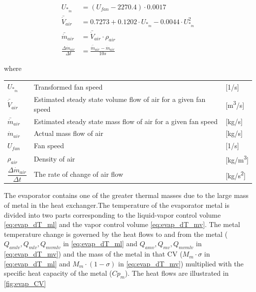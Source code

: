 \begin{align}
	U_{*_{\dot{m}}} & = (U_{fan} - 2270.4)\cdot 0.0017 \label{eq:evap_U_star_mdot}\\
	\bar{\dot{V}}_{air} & = 0.7273 + 0.1202 \cdot 	U_{*_{\dot{m}}}  -0.0044 \cdot 	U_{*_{\dot{m}}}^2	\label{eq:evap_Vbardot_air} \\
	\bar{\dot{m}}_{air} & = \bar{\dot{V}}_{air} \cdot \rho_{air}	\label{eq:Evaporator_FanAirInstantMassFlow} \\
	\frac{\Delta \dot{m}_{air}}{\Delta t} & = \frac{\bar{\dot{m}}_{air}  - \dot{m}_{air}} {10s}	\label{eq:Evaporator_FanAirRateOfChange}
\end{align}

where

\begin{center}
	\begin{tabular}{l p{8cm} l}
		$ 	U_{*_{\dot{m}}} $ 						& Transformed fan speed												& [1/\si{s}]\\
		$\bar{\dot{V}}_{air}$						& Estimated steady state volume flow of air for a given fan speed 	& [\si{m^3}/\si{s}] \\
		$\bar{\dot{m}}_{air}$						& Estimated steady state mass flow of air for a given fan speed 	& [\si{kg}/\si{s}] \\
		$\dot{m}_{air}$								& Actual mass flow of air					  						& [\si{kg}/\si{s}] \\
		$U_{fan}$									& Fan speed 														& [1/\si{s}] \\
		$\rho_{air}$								& Density of air													& [\si{kg}/\si{m^3}] \\[0.2cm]
		$\dfrac{\Delta \dot{m}_{air}}{\Delta t} $ 	& The rate of change of	air flow 									& [\si{kg}/\si{s^2}]
	\end{tabular}
\end{center}

The evaporator contains one of the greater thermal masses due to the large mass of metal in the heat exchanger.The temperature of the evaporator metal is divided into two parts corresponding to the liquid-vapor control volume \cref{eq:evap_dT_ml} and the vapor control volume \cref{eq:evap_dT_mv}. The metal temperature change is governed by the heat flows to and from the metal ($ Q_{amlv}, Q_{mlv}, Q_{mvmlv} $ in \cref{eq:evap_dT_ml} and $ Q_{amv}, Q_{mv}, Q_{mvmlv} $ in \cref{eq:evap_dT_mv}) and the mass of the metal in that CV ($M_m \cdot \sigma$ in \cref{eq:evap_dT_ml} and $M_m \cdot (1 - \sigma)$ in \cref{eq:evap_dT_mv}) multiplied with the specific heat capacity of the metal ($Cp_m$). The heat flows are illustrated in \cref{fig:evap_CV}

